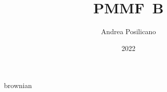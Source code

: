 \usepackage	{style}

\title	{PMMF~B}
\author	{Andrea Posilicano}
\date	{2022}


\maketitle
	{brownian}

